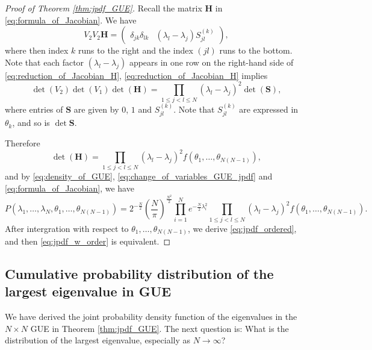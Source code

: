 \documentclass[11pt, a4paper]{article}
\numberwithin{equation}{section}
\renewcommand{\vec}[1]{\mathbf{#1}}
\theoremstyle{definition}
\theoremstyle{remark}
\begin{document}
\begin{proof}[Proof of Theorem \ref{thm:jpdf_GUE}]
  Recall the matrix $\vec{H}$ in \eqref{eq:formula_of_Jacobian}. We have
  \begin{equation} \label{eq:reduction_of_Jacobian_H}
    V_2 V_2 \vec{H} =
    \begin{pmatrix}
      \delta_{jk} \delta_{lk} & (\lambda_l - \lambda_j) S^{(k)}_{jl} 
    \end{pmatrix},
  \end{equation}
  where then index $k$ runs to the right and the index $(jl)$ runs to the bottom. Note that each factor $(\lambda_l - \lambda_j)$ appears in one row on the right-hand side of \eqref{eq:reduction_of_Jacobian_H}, \eqref{eq:reduction_of_Jacobian_H} implies
  \begin{equation}
    \det(V_2) \det(V_1) \det(\vec{H}) = \prod_{1 \leq j < l \leq N} (\lambda_l - \lambda_j)^2 \det(\vec{S}),
  \end{equation}
  where entries of $\vec{S}$ are given by $0$, $1$ and $S^{(k)}_{jl}$. Note that $S^{(k)}_{jl}$ are expressed in $\theta_k$, and so is $\det\vec{S}$.

  Therefore
  \begin{equation}
    \det(\vec{H}) = \prod_{1 \leq j < l \leq N} (\lambda_l - \lambda_j)^2 f(\theta_1, \dotsc, \theta_{N(N - 1)}),
  \end{equation}
  and by \eqref{eq:density_of_GUE}, \eqref{eq:change_of_variables_GUE_jpdf} and \eqref{eq:formula_of_Jacobian}, we have
  \begin{equation}
    P(\lambda_1, \dotsc, \lambda_N, \theta_1, \dotsc, \theta_{N(N - 1)}) = 2^{-\frac{N}{2}} \left( \frac{N}{\pi} \right)^{\frac{N^2}{2}} \prod^N_{i = 1} e^{-\frac{N}{2} \lambda^2_i} \prod_{1 \leq j < l \leq N} (\lambda_l - \lambda_j)^2 f(\theta_1, \dotsc, \theta_{N(N - 1)}).
  \end{equation}
  After intergration with respect to $\theta_1, \dotsc, \theta_{N(N - 1)}$, we derive \eqref{eq:jpdf_ordered}, and then \eqref{eq:jpdf_w_order} is equivalent.
\end{proof}

\subsection{Cumulative probability distribution of the largest eigenvalue in GUE}

We have derived the joint probability density function of the eigenvalues in the $N \times N$ GUE in Theorem \ref{thm:jpdf_GUE}. The next question is: What is the distribution of the largest eigenvalue, especially as $N \to \infty$?
\end{document}

